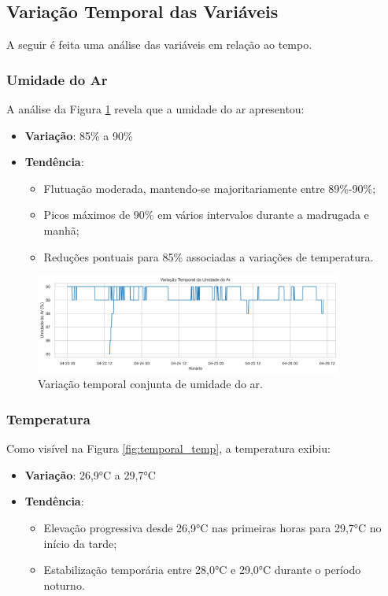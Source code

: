 \documentclass[12pt, a4paper]{article}
\begin{document}
\subsection{Variação Temporal das Variáveis}
A seguir é feita uma análise das variáveis em relação ao tempo.

\subsubsection{Umidade do Ar}
A análise da Figura \ref{fig:temporal_umidadear} revela que a umidade do ar apresentou:
\begin{itemize}
    \item \textbf{Variação}: 85\% a 90\%
    \item \textbf{Tendência}:
    \begin{itemize}
        \item Flutuação moderada, mantendo-se majoritariamente entre 89\%-90\%;
        \item Picos máximos de 90\% em vários intervalos durante a madrugada e manhã;
        \item Reduções pontuais para 85\% associadas a variações de temperatura.
    \end{itemize}
\end{itemize}

\begin{figure}[H]
\centering
\includegraphics[width=0.9\textwidth]{graficos/temporal_umidadear.png}
\caption{Variação temporal conjunta de umidade do ar.}
\label{fig:temporal_umidadear}
\end{figure}

\subsubsection{Temperatura}
Como visível na Figura \ref{fig:temporal_temp}, a temperatura exibiu:
\begin{itemize}
    \item \textbf{Variação}: 26,9°C a 29,7°C
    \item \textbf{Tendência}:
    \begin{itemize}
        \item Elevação progressiva desde 26,9°C nas primeiras horas para 29,7°C no início da tarde;
        \item Estabilização temporária entre 28,0°C e 29,0°C durante o período noturno.
    \end{itemize}
\end{itemize}
\end{document}
